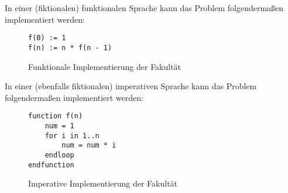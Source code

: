     In einer (fiktionalen) funktionalen Sprache kann das Problem folgendermaßen implementiert werden:
    \begin{figure}[H]
        \centering
        \begin{lstlisting}
f(0) := 1
f(n) := n * f(n - 1)
        \end{lstlisting}
        \caption{Funktionale Implementierung der Fakultät}
    \end{figure}
    
    In einer (ebenfalls fiktionalen) imperativen Sprache kann das Problem folgendermaßen implementiert werden:
    \begin{figure}[H]
        \centering
        \begin{lstlisting}
function f(n)
    num = 1
    for i in 1..n
        num = num * i
    endloop
endfunction
        \end{lstlisting}
        \caption{Imperative Implementierung der Fakultät}
    \end{figure}
